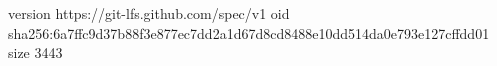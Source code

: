 version https://git-lfs.github.com/spec/v1
oid sha256:6a7ffc9d37b88f3e877ec7dd2a1d67d8cd8488e10dd514da0e793e127cffdd01
size 3443
